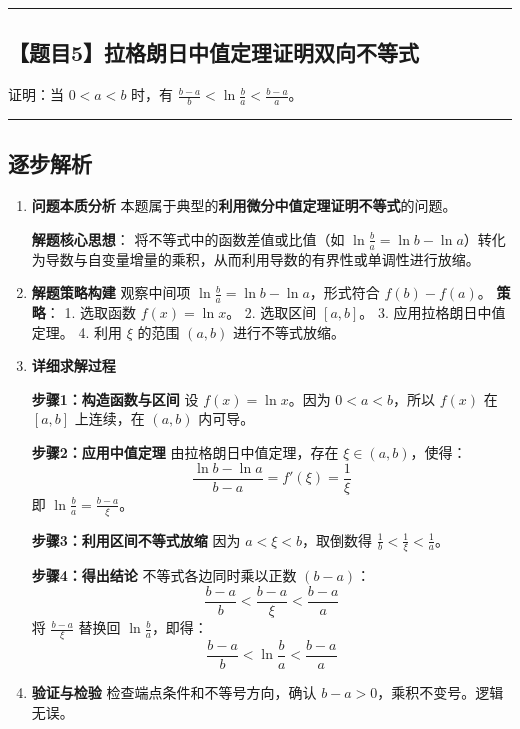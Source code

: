 \documentclass[UTF8]{ctexart}
\newenvironment{redenv}{\color{red}}{}
\newenvironment{detailedanalysis}{%
    \color{red}
    \begin{enumerate}[label=\textbf{第\arabic*步：}, leftmargin=*, align=left, itemsep=1.5ex]
}{%
    \end{enumerate}
}
\newcommand{\problemrule}{\noindent\rule{\textwidth}{1.5pt}\vspace{-0.8em}}
\newcommand{\analysisrule}{\noindent\rule{\textwidth}{0.8pt}\vspace{-0.8em}}
\begin{document}
\vspace{2em}
\problemrule
\subsection*{【题目5】拉格朗日中值定理证明双向不等式}
证明：当 $0 < a < b$ 时，有 $\frac{b-a}{b} < \ln \frac{b}{a} < \frac{b-a}{a}$。

\begin{redenv}
\analysisrule
\subsection*{逐步解析}

\begin{detailedanalysis}
\item \textbf{问题本质分析}
本题属于典型的\textbf{利用微分中值定理证明不等式}的问题。
\begin{conceptbox}
\textbf{解题核心思想}：
将不等式中的函数差值或比值（如 $\ln \frac{b}{a} = \ln b - \ln a$）转化为导数与自变量增量的乘积，从而利用导数的有界性或单调性进行放缩。
\end{conceptbox}

\item \textbf{解题策略构建}
观察中间项 $\ln \frac{b}{a} = \ln b - \ln a$，形式符合 $f(b) - f(a)$。
\textbf{策略}：
1. 选取函数 $f(x) = \ln x$。
2. 选取区间 $[a, b]$。
3. 应用拉格朗日中值定理。
4. 利用 $\xi$ 的范围 $(a, b)$ 进行不等式放缩。

\item \textbf{详细求解过程}

\noindent\textbf{步骤1：构造函数与区间}
设 $f(x) = \ln x$。因为 $0 < a < b$，所以 $f(x)$ 在 $[a, b]$ 上连续，在 $(a, b)$ 内可导。

\noindent\textbf{步骤2：应用中值定理}
由拉格朗日中值定理，存在 $\xi \in (a, b)$，使得：
\[ \frac{\ln b - \ln a}{b - a} = f'(\xi) = \frac{1}{\xi} \]
即 $\ln \frac{b}{a} = \frac{b-a}{\xi}$。

\noindent\textbf{步骤3：利用区间不等式放缩}
因为 $a < \xi < b$，取倒数得 $\frac{1}{b} < \frac{1}{\xi} < \frac{1}{a}$。

\noindent\textbf{步骤4：得出结论}
不等式各边同时乘以正数 $(b-a)$：
\[ \frac{b-a}{b} < \frac{b-a}{\xi} < \frac{b-a}{a} \]
将 $\frac{b-a}{\xi}$ 替换回 $\ln \frac{b}{a}$，即得：
\[ \frac{b-a}{b} < \ln \frac{b}{a} < \frac{b-a}{a} \]

\item \textbf{验证与检验}
检查端点条件和不等号方向，确认 $b-a > 0$，乘积不变号。逻辑无误。


\end{detailedanalysis}
\end{redenv}
\end{document}
